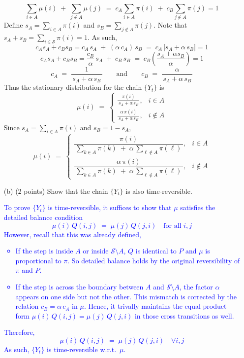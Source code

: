 \documentclass{article}
\begin{document}
\begin{itemize}
{\[
  \sum_{i\in A}\mu(i)\;+\;\sum_{j\notin A}\mu(j)
  \;=\;
  c_A \sum_{i\in A}\pi(i)\;+\;
  c_B \sum_{j\notin A}\pi(j)=1
\]
Define $s_A=\sum_{i\in A}\pi(i)$ and $s_B=\sum_{j\notin A}\pi(j)$. Note that $s_A + s_B = \sum_{i\in \mathcal{S}} \pi(i) = 1$.
As such,
\[
  c_As_A+c_Bs_B=c_A\,s_A \;+\; (\alpha\,c_A)\,s_B
  \;=\;
  c_A\,\bigl[s_A + \alpha\,s_B\bigr]=1
\]
\[
    c_As_A+c_Bs_B=\frac{c_B}{\alpha}\,s_A \;+\; c_B\,s_B
  \;=\;
  c_B(\frac{s_A+\alpha s_B}{\alpha})=1
\]
\[
  c_A 
  \;=\;
  \frac{1}{\,s_A + \alpha\,s_B\,} \qquad \text{and} \qquad
  c_B
  \;=\;
  \frac{\alpha}{\,s_A + \alpha\,s_B\,}
\]
Thus the stationary distribution for the chain $\{Y_t\}$ is 
\[
  \mu(i) 
  \;=\;
  \begin{cases}
    \displaystyle 
    \frac{\pi(i)}{\,s_A + \alpha\,s_B\,},
    & i\in A\\[7pt]
    \displaystyle
    \frac{\alpha\,\pi(i)}{\,s_A + \alpha\,s_B\,}, 
    & i\notin A
  \end{cases}
\]
Since $s_A = \sum_{i\in A}\pi(i)$ and $s_B = 1-s_A$, 
\[
  \mu(i) 
  \;=\;
  \begin{cases}
    \dfrac{\pi(i)}{\,\sum_{k\in A}\pi(k) \;+\; \alpha\,\sum_{\ell\notin A}\pi(\ell)\,}, & i \in A\\[10pt]
    \dfrac{\alpha \,\pi(i)}{\,\sum_{k\in A}\pi(k) \;+\; \alpha\,\sum_{\ell\notin A}\pi(\ell)\,}, & i \notin A
  \end{cases}
\]}

    \item[(b)] (2 points) Show that the chain $\{Y_t\}$ is also time-reversible.

    \textcolor{blue}{
        To prove $\{Y_t\}$ is time-reversible, it suffices to show that $\mu$ satisfies the detailed balance condition 
\[
  \mu(i)\,Q(i,j) \;=\; \mu(j)\,Q(j,i)
  \quad\text{for all } i,j
\]
However, recall that this was already defined, 
\begin{itemize}
\item 
If the step is inside $A$ or inside $\mathcal{S}\setminus A$, $Q$ is identical to $P$ and $\mu$ is proportional to $\pi$. So detailed balance holds by the original reversibility of $\pi$ and $P$.
\item 
If the step is across the boundary between $A$ and $\mathcal{S}\setminus A$, the factor $\alpha$ appears on one side but not the other. This mismatch is corrected by the relation $c_B=\alpha\,c_A$ in $\mu$. Hence, it trivally maintains the equal product form $\mu(i)\,Q(i,j)=\mu(j)\,Q(j,i)$ in those cross transitions as well.
\end{itemize}
Therefore,
\[
  \mu(i)\,Q(i,j) 
  \;=\;
  \mu(j)\,Q(j,i)
  \quad
  \forall i,j
\]
As such, $\{Y_t\}$ is time-reversible w.r.t.\ $\mu$.
}



\end{itemize}
\end{document}
